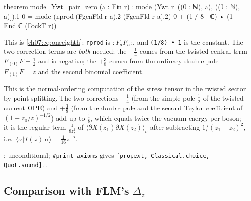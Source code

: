 \begin{leancode}
theorem mode_Ywt_pair_zero (a : Fin r) :
    mode (Ywt r [((0 : ℕ), a), ((0 : ℕ), a)]).1 0
      = mode (nprod (FgenFld r a).2 (FgenFld r a).2) 0 + (1 / 8 : ℂ) • (1 : End ℂ (FockT r))
\end{leancode}

\begin{dictionary}
This is \eqref{ch07:eq:oneeighth}: \verb|nprod| is ${:}F_aF_a{:}$, and \verb|(1/8) • 1| is the
constant. The two correction terms are \emph{both} needed: the $-\frac14$ comes from the twisted
central term $F_{(0)}F = \frac12$ and is negative; the $+\frac38$ comes from the ordinary double
pole $F_{(1)}F = z$ and the second binomial coefficient.
\end{dictionary}

\begin{physics}
This is the normal-ordering computation of the stress tensor in the twisted sector by point splitting. The two corrections $-\tfrac14$ (from the simple pole $\tfrac12$ of the twisted current OPE) and $+\tfrac38$ (from the double pole and the second Taylor coefficient of $(1+z_0/z)^{-1/2}$) add up to $\tfrac18$, which equals twice the vacuum energy per boson; it is the regular term $\tfrac1{8z_2^2}$ of $\langle\partial X(z_1)\partial X(z_2)\rangle_\sigma$ after subtracting $1/(z_1-z_2)^2$, i.e.\ $\langle\sigma|T(z)|\sigma\rangle=\tfrac1{16}z^{-2}$.
\end{physics}

\begin{status}
: unconditional; \verb|#print axioms| gives \texttt{[propext,
Classical.choice, Quot.sound]}. .
\end{status}

\subsection{Comparison with FLM's \texorpdfstring{$\Delta_z$}{Delta_z}}


